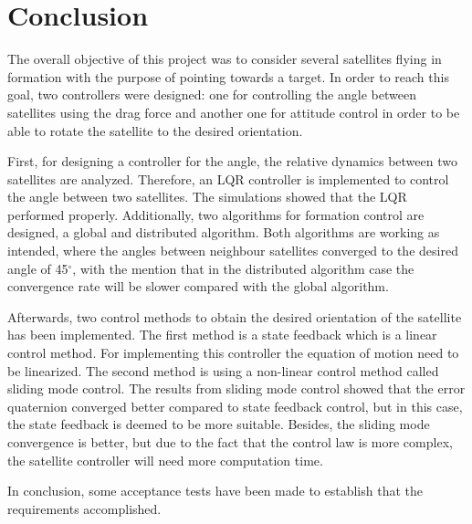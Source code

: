 \chapter{Conclusion}
The overall objective of this project was to consider several satellites flying in formation with the purpose of pointing towards a target. In order to reach this goal, two controllers were designed: one for controlling the angle between satellites using the drag force and another one for attitude control in order to be able to rotate the satellite to the desired orientation.

First, for designing a controller for the angle, the relative dynamics between two satellites are analyzed. Therefore, an LQR controller is implemented to control the angle between two satellites. The simulations showed that the LQR performed properly. Additionally, two algorithms for formation control are designed, a global and distributed algorithm. Both algorithms are working as intended, where the angles between neighbour satellites converged to the desired angle of 45$^{\circ}$, with the mention that in the distributed algorithm case the convergence rate will be slower compared with the global algorithm.

Afterwards, two control methods to obtain the desired orientation of the satellite has been implemented. The first method is a state feedback which is a linear control method. For implementing this controller the equation of motion need to be linearized. The second method is using a non-linear control method called sliding mode control. The results from sliding mode control showed that the error quaternion converged better compared to state feedback control, but in this case, the state feedback is deemed to be more suitable. Besides, the sliding mode convergence is better, but due to the fact that the control law is more complex, the satellite controller will need more computation time. 

In conclusion, some acceptance tests have been made to establish that the requirements accomplished. 